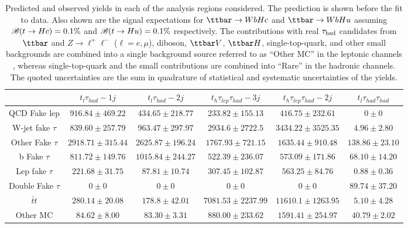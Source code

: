 \begin{table}[htbp]
\caption{
Predicted and observed yields in each of the analysis regions considered.
The prediction is shown before the fit to data. Also shown are the signal expectations for 
$\Hc$ and $\Hu$ assuming $\mathscr{B}(t\to Hc)=0.1\%$ and $\mathscr{B}(t\to Hu)=0.1\%$ respectively.
The contributions with real $\tau_{\mathrm{had}}$ candidates from $\ttbar$ and  $Z\to \ell^+\ell^-$ ($\ell = e, \mu$), diboson, $\ttbar V$, $\ttbar H$, single-top-quark, and other small backgrounds are combined into
a single background source referred to as ``Other MC'' in the leptonic channels , whereas single-top-quark and the small contributions are combined into ``Rare'' in the hadronic channels.  
The quoted uncertainties are the sum in quadrature of statistical and systematic uncertainties of the yields.}
\small
\centering
\begin{tabular}{|c|c|c|c|c|c|}
\hline 
 & $t_{l}\tau_{had}-1j$ & $t_{l}\tau_{had}-2j$ & $t_{h}\tau_{lep}\tau_{had}-3j$ & $t_{h}\tau_{lep}\tau_{had}-2j$ & $t_{l}\tau_{had}\tau_{had}$\\\hline 
  QCD Fake lep  & $916.84 \pm 469.22$ & $434.65 \pm 218.77$ & $233.82 \pm 155.13$ & $416.75 \pm 232.61$ & $0 \pm 0$ \\ 
  W-jet fake $\tau$   & $839.60 \pm 257.79$ & $963.47 \pm 297.97$ & $2934.6 \pm 2722.5$ & $3434.22 \pm 3525.35$ & $4.96 \pm 2.80$ \\ 
  Other Fake $\tau$   & $2918.71 \pm 315.44$ & $2625.87 \pm 196.24$ & $1767.93 \pm 721.15$ & $1635.44 \pm 910.48$ & $138.86 \pm 23.10$ \\ 
  b Fake $\tau$   & $811.72 \pm 149.76$ & $1015.84 \pm 244.27$ & $522.39 \pm 236.07$ & $573.09 \pm 171.86$ & $68.10 \pm 14.20$ \\ 
  Lep fake $\tau$    & $221.68 \pm 31.75$ & $87.81 \pm 10.74$ & $307.45 \pm 102.87$ & $563.25 \pm 84.76$ & $0.88 \pm 0.36$ \\ 
  Double Fake $\tau$    & $0 \pm 0$ & $0 \pm 0$ & $0 \pm 0$ & $0 \pm 0$ & $89.74 \pm 37.20$ \\ 
  $\bar{t}t$   & $280.14 \pm 20.08$ & $178.8 \pm 42.01$ & $7081.53 \pm 2237.99$ & $11610.1 \pm 1263.95$ & $5.10 \pm 4.28$ \\ 
  Other MC   & $84.62 \pm 8.00$ & $83.30 \pm 3.31$ & $880.00 \pm 233.62$ & $1591.41 \pm 254.97$ & $40.79 \pm 2.02$ \\\hline

\end{tabular}
\end{table}
